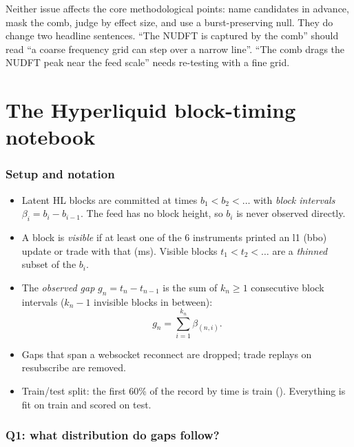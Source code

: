 \documentclass[11pt,a4paper]{article}
\newcommand{\code}[1]{\texttt{\detokenize{#1}}}
\begin{document}
\begin{note}
Neither issue affects the core methodological points: name candidates in advance, mask the comb, judge by effect size, and use a burst-preserving null. They do change two
headline sentences. ``The NUDFT is captured by the comb'' should read ``a coarse frequency grid can step over a narrow line''. ``The comb drags the NUDFT
peak near the feed scale'' needs re-testing with a fine grid.
\end{note}

\part{The Hyperliquid block-timing notebook}

\section{Setup and notation}
\begin{itemize}
  \item Latent HL blocks are committed at times $b_1<b_2<\dots$ with \emph{block intervals} $\beta_i=b_{i}-b_{i-1}$. The feed has no block height, so
        $b_i$ is never observed directly.
  \item A block is \emph{visible} if at least one of the 6 instruments printed an l1 (bbo) update or trade with that \code{ts_exch} (ms). Visible blocks
        $t_1<t_2<\dots$ are a \emph{thinned} subset of the $b_i$.
  \item The \emph{observed gap} $g_n=t_n-t_{n-1}$ is the sum of $k_n\ge1$ consecutive block intervals ($k_n-1$ invisible blocks in between):
        \begin{equation}\label{eq:gapsum} g_n = \sum_{i=1}^{k_n}\beta_{(n,i)} . \end{equation}
  \item Gaps that span a websocket reconnect are dropped; trade replays on resubscribe are removed.
  \item Train/test split: the first 60\% of the record by time is train (\code{TRAIN_FRAC}). Everything is fit on train and scored on test.
\end{itemize}

\section{Q1: what distribution do gaps follow?}
\end{document}
